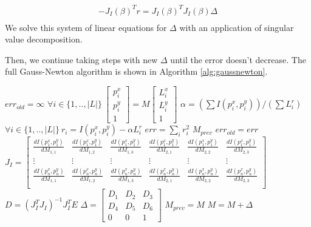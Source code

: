 \documentclass[float=false, crop=false]{standalone}
\begin{document}
\begin{eqnarray*}
  -J_I(\beta)^T r = J_I(\beta)^T J_I(\beta) \Delta\\
\end{eqnarray*}
We solve this system of linear equations for $\Delta$ with an application of singular value decomposition.

Then, we continue taking steps with new $\Delta$ until the error doesn't decrease. The full Gauss-Newton
algorithm is shown in Algorithm \ref{alg:gaussnewton}.

	\begin{algorithmic}
		\STATE $err_{old} = \infty$
		\LOOP
		\STATE $\forall i \in \{1,..,|L|\}~\left[\begin{array}{c}p_i^x\\p_i^y\\1\end{array}\right] =
				M \left[\begin{array}{c}L_i^x\\L_i^y\\1\end{array}\right]$
		\STATE $\alpha = \left(\sum I(p_i^x, p_i^y)\right) / \left(\sum L_i^r\right)$
		\STATE $\forall i \in \{1,..,|L|\}~r_i = I(p_i^x, p_i^y) - \alpha L_i^r$
		\STATE $err = \sum_i r_i^2$
			\RETURN $M_{prev}$
		\ENDIF
		\STATE $err_{old} = err$
		\STATE $J_I = \left[\begin{array}{cccccc}
			\frac{dI(p_1^x, p_1^y)}{dM_{1,1}}&\frac{dI(p_1^x, p_1^y)}{dM_{1,2}}&\frac{dI(p_1^x, p_1^y)}{dM_{1,3}}&\frac{dI(p_1^x, p_1^y)}{dM_{2,1}}&\frac{dI(p_1^x, p_1^y)}{dM_{2,2}}&\frac{dI(p_1^x, p_1^y)}{dM_{2,3}}\\
			\vdots&\vdots&\vdots&\vdots&\vdots&\vdots\\
			\frac{dI(p_n^x, p_n^y)}{dM_{1,1}}&\frac{dI(p_n^x, p_n^y)}{dM_{1,2}}&\frac{dI(p_n^x, p_n^y)}{dM_{1,3}}&\frac{dI(p_n^x, p_n^y)}{dM_{2,1}}&\frac{dI(p_n^x, p_n^y)}{dM_{2,2}}&\frac{dI(p_n^x, p_n^y)}{dM_{2,3}}\\
			\end{array}\right]$
		\STATE $D = \left(J_I^T J_I\right)^{-1} J_I^T E$
		\STATE $\Delta = \left[\begin{array}{ccc}
				D_1&D_2&D_3\\D_4&D_5&D_6\\0&0&1
			\end{array}\right]$
		\STATE $M_{prev} = M$
		\STATE $M = M + \Delta$
		\ENDLOOP
	\end{algorithmic}
	\label{alg:gaussnewton}
\end{document}
